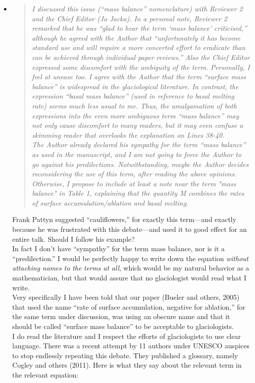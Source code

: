\documentclass[11pt,reqno]{amsart}
\newcommand{\reply}[2]{
\medskip\medskip
\item  \begin{quote}
\emph{#1}
\end{quote}

\medskip
\noindent #2}
\begin{document}
\begin{itemize}
\reply{I discussed this issue (``mass balance'' nomenclature) with Reviewer 2 and the Chief Editor (Jo Jacka). In a personal note, Reviewer 2 remarked that he was ``glad to hear the term `mass balance' criticised,'' although he agreed with the Author that ``unfortunately it has become standard use and will require a more concerted effort to eradicate than can be achieved through individual paper reviews.''  Also the Chief Editor expressed some discomfort with the ambiguity of the term.  Personally, I feel at unease too.  I agree with the Author that the term ``surface mass balance'' is widespread in the glaciological literature.  In contrast, the expression ``basal mass balance'' (used in reference to basal melting rate) seems much less usual to me.  Thus, the amalgamation of both expressions into the even more ambiguous term ``mass balance'' may not only cause discomfort to many readers, but it may even confuse a skimming reader that overlooks the explanation on Lines 38-40.
\medskip \\
The Author already declared his sympathy for the term ``mass balance'' as used in the manuscript, and I am not going to force the Author to go against his predilections. Notwithstanding, maybe the Author decides reconsidering the use of this term, after reading the above opinions. Otherwise, I propose to include at least a note near the term "mass balance" in Table 1, explaining that the quantity M combines the rates of surface accumulation/ablation and basal melting.}
{Frank Pattyn suggested ``cauliflowers,'' for exactly this term---and exactly because he was frustrated with this debate---and used it to good effect for an entire talk.  Should I follow his example?
\medskip \\
In fact I don't have ``sympathy'' for the term mass balance, nor is it a ``predilection.''  I would be perfectly happy to write down the equation \emph{without attaching names to the terms at all}, which would be my natural behavior as a mathematician, but that would assure that no glaciologist would read what I write.
\medskip \\
Very specifically I have been told that our paper (Bueler and others, 2005) that used the name ``rate of surface accumulation, negative for ablation,'' for the same term under discussion, was using an obscure name and that it should be called ``surface mass balance'' to be acceptable to glaciologists.
\medskip \\
I do read the literature and I respect the efforts of glaciologists to use clear language.  There was a recent attempt by 11 authors under UNESCO auspices to stop endlessly repeating this debate.  They published a glossary, namely Cogley and others (2011).  Here is what they say about the relevant term in the relevant equation: \\
}
\end{itemize}
\end{document}
